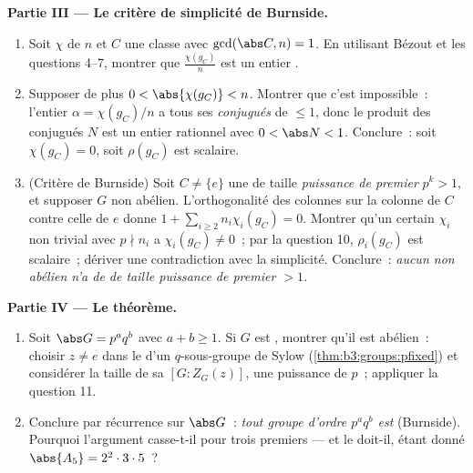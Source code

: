 \begin{problem}
\medskip
\noindent\textbf{Partie III --- Le critère de simplicité de
Burnside.}
\begin{enumerate}[resume]
  \item Soit $\chi$  de  $n$ et $C$ une classe
        avec $\gcd(\abs C, n) = 1$. En utilisant Bézout et les
        questions 4--7, montrer que $\frac{\chi(g_C)}{n}$ est
        un entier .
  \item Supposer de plus $0 < \abs{\chi(g_C)} < n$. Montrer que
        c'est impossible~: l'entier  $\alpha =
        \chi(g_C)/n$ a tous ses \emph{conjugués} de 
        $\leq 1$, donc le produit des conjugués $N$ est un
        entier  rationnel avec $0 < \abs N < 1$.
        Conclure~: soit $\chi(g_C) = 0$, soit $\rho(g_C)$ est
        scalaire.
  \item (Critère de Burnside) Soit $C \neq \{e\}$ une  de taille \emph{puissance de premier} $p^k
        > 1$, et supposer $G$  non abélien. L'orthogonalité
        des colonnes sur la colonne de $C$ contre celle de $e$
        donne $1 + \sum_{i \geq 2} n_i\chi_i(g_C) = 0$. Montrer
        qu'un certain $\chi_i$ non trivial avec $p \nmid n_i$ a
        $\chi_i(g_C) \neq 0$~; par la question 10, $\rho_i(g_C)$
        est scalaire~; dériver une contradiction avec la
        simplicité. Conclure~: \emph{aucun  non
        abélien n'a de  de taille puissance
        de premier $> 1$.}
\end{enumerate}

\medskip
\noindent\textbf{Partie IV --- Le théorème.}
\begin{enumerate}[resume]
  \item Soit $\abs G = p^aq^b$ avec $a + b \geq 1$. Si $G$ est
        , montrer qu'il est abélien~: choisir $z \neq e$
        dans le  d'un $q$-sous-groupe de Sylow
        (\cref{thm:b3:groups:pfixed}) et considérer la taille
        de sa  $[G : Z_G(z)]$, une
        puissance de $p$~; appliquer la question 11.
  \item Conclure par récurrence sur $\abs G$~: \emph{tout
        groupe d'ordre $p^aq^b$ est } (Burnside).
        Pourquoi l'argument casse-t-il pour trois premiers ---
        et le doit-il, étant donné $\abs{A_5} = 2^2\cdot3\cdot
        5$~?
\end{enumerate}


\end{problem}
